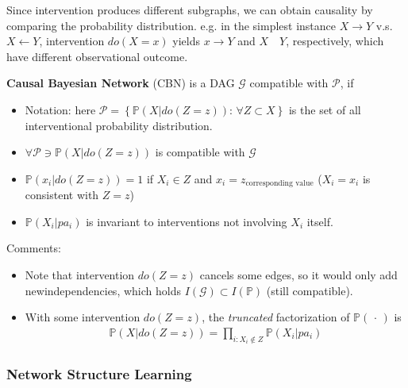 Since intervention produces different subgraphs, we can obtain causality by comparing the probability distribution. e.g. in the simplest instance $ X\to Y $ v.s. $ X\leftarrow Y $, intervention $ do(X=x) $ yields $ x\to Y $ and $ X\quad Y $, respectively, which have different observational outcome.

\textbf{Causal Bayesian Network} (CBN) is a DAG $ \mathcal{G} $ compatible with $ \mathcal{P} $, if 
\begin{itemize}[topsep=2pt,itemsep=0pt]
    \item Notation: here $ \mathcal{P}=\left\{ \mathbb{P}\left( X|do(Z=z) \right):\,\forall Z\subset X  \right\} $ is the set of all interventional probability distribution.
    \item $ \forall \mathcal{P}\ni \mathbb{P}\left( X|do(Z=z) \right)   $ is compatible with $ \mathcal{G} $
    \item $ \mathbb{P}\left( x_i|do(Z=z) \right)=1   $ if $ X_i\in Z $ and $ x_i=z_{\text{corresponding value}} $ ($ X_i=x_i $ is consistent with $ Z=z $)
    \item $ \mathbb{P}\left( X_i|pa_i \right)  $ is invariant to interventions not involving $ X_i $ itself.
\end{itemize}

Comments:
\begin{itemize}[topsep=2pt,itemsep=0pt]
    \item Note that intervention $ do(Z=z) $ cancels some edges, so it would only add newindependencies, which holds $ I(\mathcal{G})\subset I(\mathbb{P} ) $ (still compatible).
    \item With some intervention $ do(Z=z) $, the \textit{truncated} factorization of $ \mathbb{P}\left( \, \cdot \,  \right)  $ is
    \begin{align*}
        \mathbb{P}\left( X | do(Z=z) \right)  =  \prod_{i:X_i\notin Z}\mathbb{P}\left( X_i|pa_i \right) 
    \end{align*}
    
    
\end{itemize}

    

    








\subsubsection{Network Structure Learning}

